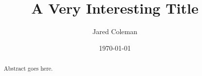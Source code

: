\documentclass{article}
\title{A Very Interesting Title}
\author[1]{Jared Coleman}
\affil[1]{Loyola Marymount University}
\date{\today}
\begin{document}
\maketitle

\begin{abstract}
Abstract goes here. 
\end{abstract}


%
%
%
\end{document}
